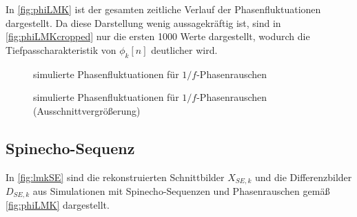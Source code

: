 In \autoref{fig:phiLMK} ist der gesamten zeitliche Verlauf der Phasenfluktuationen dargestellt. Da diese Darstellung wenig aussagekräftig ist, sind in \autoref{fig:phiLMKcropped} nur die ersten 1000 Werte dargestellt, wodurch die Tiefpasscharakteristik von $\phi_k[n]$ deutlicher wird.

\begin{figure}[H]
	\centering
	\caption[simulierte Phasenfluktuationen für $1/f$-Phasenrauschen]{simulierte Phasenfluktuationen für $1/f$-Phasenrauschen}
	\label{fig:phiLMK}
\end{figure}

\begin{figure}[H]
	\centering
	\caption[simulierte Phasenfluktuationen für $1/f$-Phasenrauschen (Vergrößerung)]{simulierte Phasenfluktuationen für $1/f$-Phasenrauschen (Ausschnittvergrößerung)}
	\label{fig:phiLMKcropped}
\end{figure}

\subsection{Spinecho-Sequenz}
In \autoref{fig:lmkSE} sind die rekonstruierten Schnittbilder $X_{SE,k}$ und die Differenzbilder $D_{SE,k}$ aus Simulationen mit Spinecho-Sequenzen und Phasenrauschen gemäß \autoref{fig:phiLMK} dargestellt.

